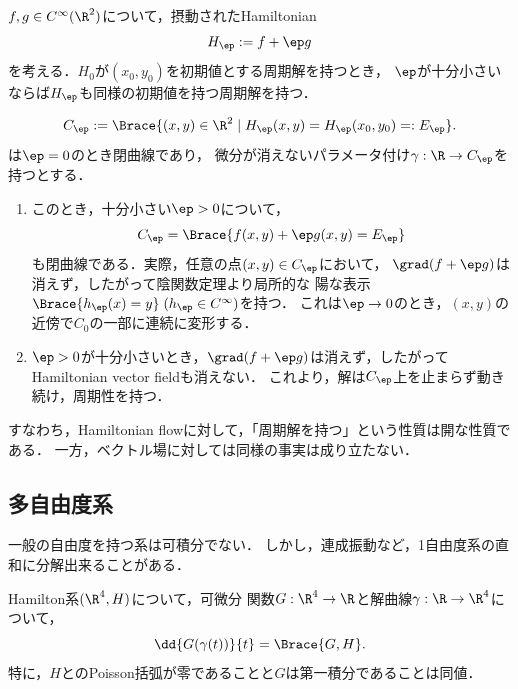 \documentclass[uplatex,dvipdfmx]{jsreport}
\begin{document}
\begin{problem}[Hamilton系の周期解は摂動に対して安定]
    $f,g\in C^\infty(\R^2)$について，摂動されたHamiltonian
    \[H_\ep:=f+\ep g\]
    を考える．$H_0$が$(x_0,y_0)$を初期値とする周期解を持つとき，
    $\ep$が十分小さいならば$H_\ep$も同様の初期値を持つ周期解を持つ．
\end{problem}
\begin{Proof}
    \[C_\ep:=\Brace{(x,y)\in\R^2\mid H_\ep(x,y)=H_\ep(x_0,y_0)=:E_\ep}.\]
    は$\ep=0$のとき閉曲線であり，
    微分が消えないパラメータ付け$\gamma:\R\to C_\ep$を持つとする．
    \begin{enumerate}[{Step}1]
        \item このとき，十分小さい$\ep>0$について，
        \[C_\ep=\Brace{f(x,y)+\ep g(x,y)=E_\ep}\]
        も閉曲線である．実際，任意の点$(x,y)\in C_\ep$において，
        $\grad(f+\ep g)$は消えず，したがって陰関数定理より局所的な
        陽な表示$\Brace{h_\ep(x)=y}\;(h_\ep\in C^\infty)$を持つ．
        これは$\ep\to0$のとき，$(x,y)$の近傍で$C_0$の一部に連続に変形する．
        \item $\ep>0$が十分小さいとき，$\grad(f+\ep g)$は消えず，したがってHamiltonian vector fieldも消えない．
        これより，解は$C_\ep$上を止まらず動き続け，周期性を持つ．
    \end{enumerate}
\end{Proof}
\begin{remark}
    すなわち，Hamiltonian flowに対して，「周期解を持つ」という性質は開な性質である．
    一方，ベクトル場に対しては同様の事実は成り立たない．
\end{remark}

\subsection{多自由度系}

\begin{tcolorbox}[colframe=ForestGreen, colback=ForestGreen!10!white,breakable,colbacktitle=ForestGreen!40!white,coltitle=black,fonttitle=\bfseries\sffamily,
title=]
    一般の自由度を持つ系は可積分でない．
    しかし，連成振動など，1自由度系の直和に分解出来ることがある．
\end{tcolorbox}

\begin{theorem}[第一積分の特徴付け]
    Hamilton系$(\R^4,H)$について，可微分
    関数$G:\R^4\to\R$と解曲線$\gamma:\R\to\R^4$について，
    \[\dd{G(\gamma(t))}{t}=\Brace{G,H}.\]
    特に，$H$とのPoisson括弧が零であることと$G$は第一積分であることは同値．
\end{theorem}
\end{document}

